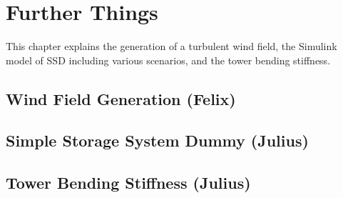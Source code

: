 \chapter{Further Things}
This chapter explains the generation of a turbulent wind field, the Simulink model of \gls{SSD} including various scenarios, and the tower bending stiffness.
\section{Wind Field Generation (Felix)}


\section{Simple Storage System Dummy (Julius)}


\section{Tower Bending Stiffness (Julius)}



